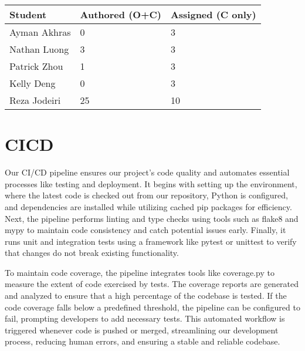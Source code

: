 \documentclass{article}
\begin{document}
\begin{table}[H]
\centering
\begin{tabular}{lll}
\toprule
\textbf{Student} & \textbf{Authored (O+C)} & \textbf{Assigned (C only)}\\
\midrule
Ayman Akhras  & 0 & 3 \\
Nathan Luong & 3 & 3 \\
Patrick Zhou & 1 & 3 \\
Kelly Deng & 0 & 3 \\
Reza Jodeiri & 25 & 10 \\
\bottomrule
\end{tabular}
\end{table}


\section{CICD}
Our CI/CD pipeline ensures our project's code quality and automates essential processes like testing and deployment. It begins with setting up the environment, where the latest code is checked out from our repository, Python is configured, and dependencies are installed while utilizing cached pip packages for efficiency. Next, the pipeline performs linting and type checks using tools such as flake8 and mypy to maintain code consistency and catch potential issues early. Finally, it runs unit and integration tests using a framework like pytest or unittest to verify that changes do not break existing functionality. 

To maintain code coverage, the pipeline integrates tools like coverage.py to measure the extent of code exercised by tests. The coverage reports are generated and analyzed to ensure that a high percentage of the codebase is tested. If the code coverage falls below a predefined threshold, the pipeline can be configured to fail, prompting developers to add necessary tests. This automated workflow is triggered whenever code is pushed or merged, streamlining our development process, reducing human errors, and ensuring a stable and reliable codebase.
\end{document}
